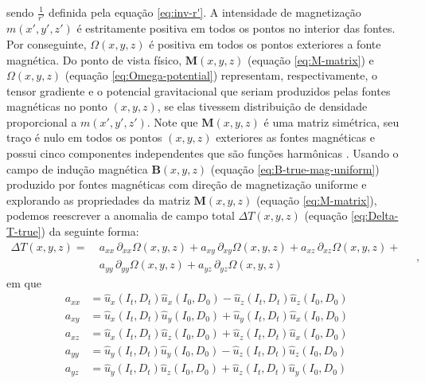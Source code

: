 sendo $\frac{1}{r'}$ definida pela equação \ref{eq:inv-r'}.
A intensidade de magnetização $m(x', y', z')$ é estritamente positiva em todos os pontos no interior das fontes. 
Por conseguinte, $\Omega(x, y, z)$ é positiva em todos os pontos exteriores a fonte magnética. Do ponto de vista físico, 
$\mathbf{M}(x, y, z)$ (equação \ref{eq:M-matrix}) e $\Omega(x, y, z)$ (equação \ref{eq:Omega-potential}) representam, 
respectivamente, o tensor gradiente e o potencial gravitacional que seriam produzidos pelas fontes magnéticas no ponto 
$(x,y,z)$, se elas tivessem distribuição de densidade proporcional a $m(x', y', z')$. Note que $\mathbf{M}(x, y, z)$ é 
uma matriz simétrica, seu traço é nulo em todos os pontos $(x,y,z)$ exteriores as fontes magnéticas e possui cinco 
componentes independentes que são funções harmônicas \citep{pedersen_rasmussen1990}. 
Usando o campo de indução magnética $\mathbf{B}(x, y, z)$ (equação \ref{eq:B-true-mag-uniform}) produzido 
por fontes magnéticas com direção de magnetização uniforme e explorando as propriedades da matriz 
$\mathbf{M}(x, y, z)$ (equação \ref{eq:M-matrix}), podemos reescrever a anomalia de campo total 
$\Delta T(x, y, z)$ (equação \ref{eq:Delta-T-true}) da seguinte forma:
\begin{equation}
	\begin{split}
		\Delta T(x, y, z) = \:
		& a_{xx} \, \partial_{xx} \Omega(x, y, z) + 
		a_{xy} \, \partial_{xy} \Omega(x, y, z) + 
		a_{xz} \, \partial_{xz} \Omega(x, y, z) + \\
		& a_{yy} \, \partial_{yy} \Omega(x, y, z) + 
		a_{yz} \, \partial_{yz} \Omega(x, y, z)
	\end{split} \quad ,
	\label{eq:Delta-T-true-mag-uniform}
\end{equation}
em que 
\begin{equation}
	\begin{split}
		a_{xx} &= \hat{u}_{x}(I_{t}, D_{t}) \hat{u}_{x}(I_{0}, D_{0}) - \hat{u}_{z}(I_{t}, D_{t}) \hat{u}_{z}(I_{0}, D_{0}) \\
		a_{xy} &= \hat{u}_{x}(I_{t}, D_{t}) \hat{u}_{y}(I_{0}, D_{0}) + \hat{u}_{y}(I_{t}, D_{t}) \hat{u}_{x}(I_{0}, D_{0}) \\
		a_{xz} &= \hat{u}_{x}(I_{t}, D_{t}) \hat{u}_{z}(I_{0}, D_{0}) + \hat{u}_{z}(I_{t}, D_{t}) \hat{u}_{x}(I_{0}, D_{0}) \\
		a_{yy} &= \hat{u}_{y}(I_{t}, D_{t}) \hat{u}_{y}(I_{0}, D_{0}) - \hat{u}_{z}(I_{t}, D_{t}) \hat{u}_{z}(I_{0}, D_{0}) \\
		a_{yz} &= \hat{u}_{y}(I_{t}, D_{t}) \hat{u}_{z}(I_{0}, D_{0}) + \hat{u}_{z}(I_{t}, D_{t}) \hat{u}_{y}(I_{0}, D_{0})
	\end{split}
\label{eq:a-coefficients-sources}
\end{equation}
